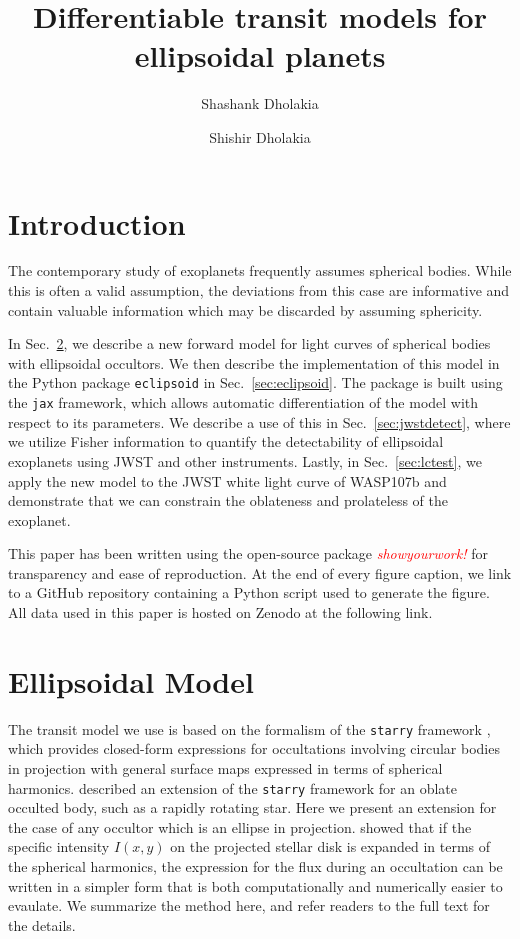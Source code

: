 \documentclass[twocolumn]{aastex631}
\begin{document}
\title{Differentiable transit models for ellipsoidal planets}

\author{Shashank Dholakia} \author{Shishir Dholakia}

\begin{abstract}

\end{abstract}

\section{Introduction} \label{sec:intro}
The contemporary study of exoplanets frequently assumes spherical bodies. While this is often a valid assumption, the deviations from this case are informative and contain valuable information which may be discarded by assuming sphericity.

In Sec.~\ref{sec:model}, we describe a new forward model for light curves of spherical bodies with ellipsoidal occultors. We then describe the implementation of this model in the Python package \texttt{eclipsoid} in Sec.~\ref{sec:eclipsoid}. The package is built using the \texttt{jax} framework, which allows automatic differentiation of the model with respect to its parameters. We describe a use of this in Sec.~\ref{sec:jwstdetect}, where we utilize Fisher information to quantify the detectability of ellipsoidal exoplanets using JWST and other instruments. Lastly, in Sec.~\ref{sec:lctest}, we apply the new model to the JWST white light curve of WASP107b and demonstrate that we can constrain the oblateness and prolateless of the exoplanet. 

This paper has been written using the open-source package \textcolor{red}{\textit{showyourwork!}} for transparency and ease of reproduction. At the end of every figure caption, we link to a GitHub repository containing a Python script used to generate the figure. All data used in this paper is hosted on Zenodo at the following link.

\section{Ellipsoidal Model}
\label{sec:model}
The transit model we use is based on the formalism of the \texttt{starry} framework \citep{starry2019}, which provides closed-form expressions for occultations involving circular bodies in projection with general surface maps expressed in terms of spherical harmonics. \citet{dholakia2022} described an extension of the \texttt{starry} framework for an oblate occulted body, such as a rapidly rotating star. Here we present an extension for the case of any occultor which is an ellipse in projection. \citet{starry2019} showed that if the specific intensity $I(x,y)$ on the projected stellar disk is expanded in terms of the spherical harmonics, the expression for the flux during an occultation can be written in a simpler form that is both computationally and numerically easier to evaulate. We summarize the method here, and refer readers to the full text for the details. 
\end{document}
